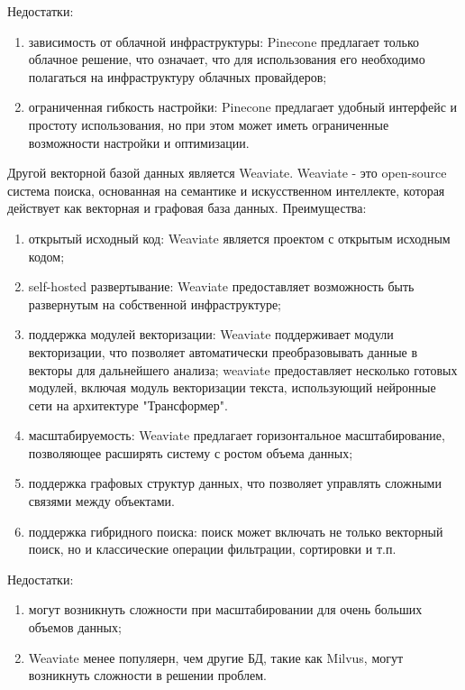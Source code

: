 Недостатки:

\begin{enumerate}
    \item зависимость от облачной инфраструктуры: Pinecone предлагает только облачное решение, что означает, что для использования его необходимо полагаться на инфраструктуру облачных провайдеров;
    \item ограниченная гибкость настройки: Pinecone предлагает удобный интерфейс и простоту использования, но при этом может иметь ограниченные возможности настройки и оптимизации.
\end{enumerate}

Другой векторной базой данных является Weaviate. Weaviate - это open-source система поиска, основанная на семантике и искусственном интеллекте, которая действует как векторная и графовая база данных. Преимущества:
\begin{enumerate}
    \item открытый исходный код: Weaviate является проектом с открытым исходным кодом;
    \item self-hosted развертывание: Weaviate предоставляет возможность быть развернутым на собственной инфраструктуре;
    \item поддержка модулей векторизации: Weaviate поддерживает модули векторизации, что позволяет автоматически преобразовывать данные в векторы для дальнейшего анализа; weaviate предоставляет несколько готовых модулей, включая модуль векторизации текста, использующий нейронные сети на архитектуре "Трансформер".
    \item масштабируемость: Weaviate предлагает горизонтальное масштабирование, позволяющее расширять систему с ростом объема данных;
    \item поддержка графовых структур данных, что позволяет управлять сложными связями между объектами.
    \item поддержка гибридного поиска: поиск может включать не только векторный поиск, но и классические операции фильтрации, сортировки и т.п.
\end{enumerate}

Недостатки:
\begin{enumerate}
    \item могут возникнуть сложности при масштабировании для очень больших объемов данных;
    \item Weaviate менее популяерн, чем другие БД, такие как Milvus, могут возникнуть сложности в решении проблем.
\end{enumerate}

